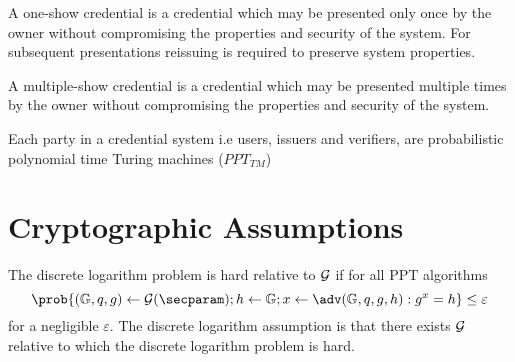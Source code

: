 \begin{definition}
A one-show credential is a credential which may be presented only once by the owner without compromising the properties and security of the system. For subsequent presentations reissuing is required to preserve system properties.
\end{definition}

\begin{definition}
A multiple-show credential is a credential which may be presented multiple times by the owner without compromising the properties and security of the system.
\end{definition}

\begin{definition}
Each party in a credential system i.e users, issuers and verifiers, are probabilistic polynomial time Turing machines ($\textit{PPT}_{\textit{TM}}$) 
\end{definition}



\section{Cryptographic Assumptions}


\begin{assumption}
The discrete logarithm problem is hard relative to $\mathcal{G}$ if for all \textsc{PPT} algorithms \adv
$$\prob{(\Group, q, g) \gets \setup(\secparam); h \gets \Group; x \gets \adv(\Group, q, g, h): g^x = h} \leq \varepsilon $$
for a negligible $\varepsilon$. 
The discrete logarithm assumption is that there exists $\mathcal{G}$ relative to which the discrete logarithm problem is hard.
\end{assumption}

